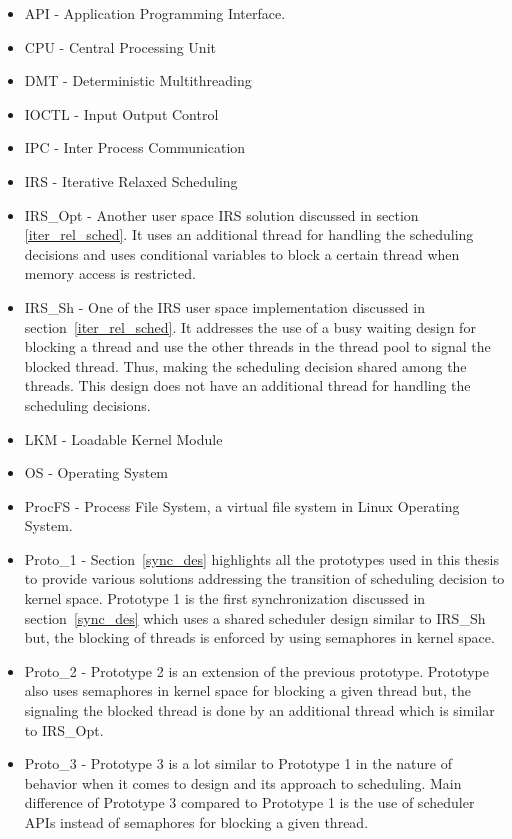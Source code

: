 \begin{itemize}

\item 	API 	-   Application Programming Interface.
\item	CPU		-	Central Processing Unit
\item	DMT		-	Deterministic Multithreading
\item	IOCTL	-	Input Output Control
\item	IPC		-	Inter Process Communication
\item	IRS		-	Iterative Relaxed Scheduling
\item  {IRS\_Opt} - Another user space IRS solution discussed in section~ \ref{iter_rel_sched}. 
It uses an additional thread for handling the scheduling decisions and uses conditional variables to block a certain thread when memory access is restricted. 
\item {IRS\_Sh} - One of the IRS user space implementation discussed in section~\ref{iter_rel_sched}. 
It addresses the use of a busy waiting design for blocking a thread and use the other threads in the thread pool to signal the blocked thread. 
Thus, making the scheduling decision shared among the threads. 
This design does not have an additional thread for handling the scheduling decisions. 
\item	LKM		-	Loadable Kernel Module
\item	OS		-	Operating System
\item	ProcFS  -   Process File System, a virtual file system in Linux Operating System.
\item {Proto\_1} - Section~\ref{sync_des} highlights all the prototypes used in this thesis to provide various solutions addressing the transition of scheduling decision to kernel space. 
Prototype 1 is the first synchronization discussed in section~\ref{sync_des} which uses a shared scheduler design similar to IRS\_Sh but, the blocking of threads is enforced by using semaphores in kernel space. 
\item {Proto\_2} - Prototype 2 is an extension of the previous prototype. 
Prototype also uses semaphores in kernel space for blocking a given thread but, the signaling the blocked thread is done by an additional thread which is similar to IRS\_Opt.
\item {Proto\_3} - Prototype 3 is a lot similar to Prototype 1 in the nature of behavior when it comes to design and its approach to scheduling. 
Main difference of Prototype 3 compared to Prototype 1 is the use of scheduler APIs instead of semaphores for blocking a given thread. 

\end{itemize}
